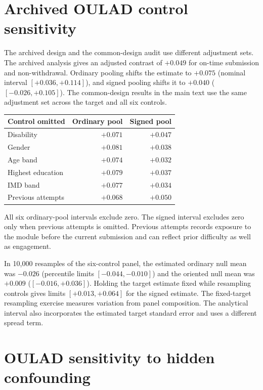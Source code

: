 \clearpage
\appendix
\section{Archived OULAD control sensitivity}

The archived design and the common-design audit use different adjustment sets. The archived analysis gives an adjusted contrast of $+0.049$ for on-time submission and non-withdrawal. Ordinary pooling shifts the estimate to $+0.075$ (nominal interval $[+0.036,+0.114]$), and signed pooling shifts it to $+0.040$ ($[-0.026,+0.105]$). The common-design results in the main text use the same adjustment set across the target and all six controls.

\begin{center}\small
\begin{tabular}{lrr}
\toprule
Control omitted & Ordinary pool & Signed pool \\
\midrule
Disability & $+0.071$ & $+0.047$\\
Gender & $+0.081$ & $+0.038$\\
Age band & $+0.074$ & $+0.032$\\
Highest education & $+0.079$ & $+0.037$\\
IMD band & $+0.077$ & $+0.034$\\
Previous attempts & $+0.068$ & $+0.050$\\
\bottomrule
\end{tabular}
\end{center}

All six ordinary-pool intervals exclude zero. The signed interval excludes zero only when previous attempts is omitted. Previous attempts records exposure to the module before the current submission and can reflect prior difficulty as well as engagement.

In 10,000 resamples of the six-control panel, the estimated ordinary null mean was $-0.026$ (percentile limits $[-0.044,-0.010]$) and the oriented null mean was $+0.009$ ($[-0.016,+0.036]$). Holding the target estimate fixed while resampling controls gives limits $[+0.013,+0.064]$ for the signed estimate. The fixed-target resampling exercise measures variation from panel composition. The analytical interval also incorporates the estimated target standard error and uses a different spread term.

\clearpage
\section{OULAD sensitivity to hidden confounding}

